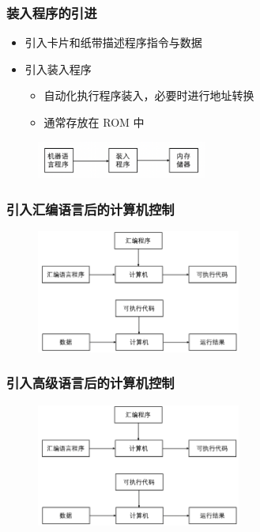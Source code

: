 \documentclass[cs4size,a4paper,10pt]{ctexart}
\begin{document}
	\subsubsection{装入程序的引进}
	\begin{itemize}
		\item 引入卡片和纸带描述程序指令与数据
		\item 引入装入程序
		\begin{itemize}
			\item 自动化执行程序装入，必要时进行地址转换
			\item 通常存放在 ROM 中
		\end{itemize}
	\end{itemize}
	\begin{figure}[H]
		\centering
		\includegraphics[width=0.5\textwidth]{img/1.2.1.2}
	\end{figure}


	\subsubsection{引入汇编语言后的计算机控制}
	\begin{figure}[H]
		\centering
		\includegraphics[width=0.6\textwidth]{img/1.2.1.3}
	\end{figure}


	\subsubsection{引入高级语言后的计算机控制}
	\begin{figure}[H]
		\centering
		\includegraphics[width=0.6\textwidth]{img/1.2.1.3}
	\end{figure}
\end{document}
